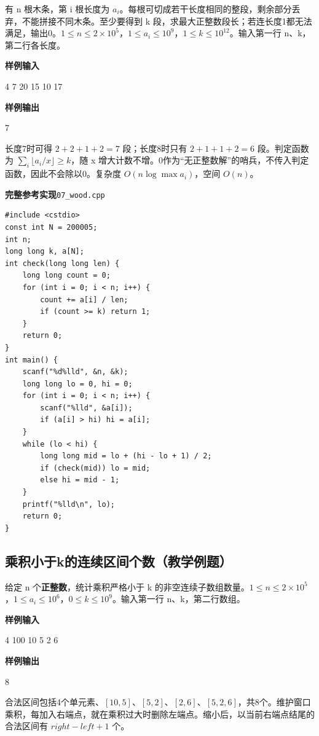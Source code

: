 \documentclass[UTF8,11pt,a4paper,fontset=none]{ctexart}
\begin{document}
有 n 根木条，第 i 根长度为 $a_i$。每根可切成若干长度相同的整段，剩余部分丢弃，不能拼接不同木条。至少要得到 k 段，求最大正整数段长；若连长度1都无法满足，输出0。$1\le n\le2\times10^5$，$1\le a_i\le10^9$，$1\le k\le10^{12}$。输入第一行 n、k，第二行各长度。
\begin{tcolorbox}[samplebox,title={输入输出样例}]
\textbf{样例输入}
\begin{Sample}
4 7
20 15 10 17
\end{Sample}
\tcblower
\textbf{样例输出}
\begin{Sample}
7
\end{Sample}
\end{tcolorbox}
长度7时可得 $2+2+1+2=7$ 段；长度8时只有 $2+1+1+2=6$ 段。判定函数为 $\sum_i\lfloor a_i/x\rfloor\ge k$，随 x 增大计数不增。0作为“无正整数解”的哨兵，不传入判定函数，因此不会除以0。复杂度 $O(n\log\max a_i)$，空间 $O(n)$。
\par\noindent\begin{minipage}{\linewidth}
\textbf{完整参考实现}\quad\texttt{07\_wood.cpp}
\begin{lstlisting}
#include <cstdio>
const int N = 200005;
int n;
long long k, a[N];
int check(long long len) {
    long long count = 0;
    for (int i = 0; i < n; i++) {
        count += a[i] / len;
        if (count >= k) return 1;
    }
    return 0;
}
int main() {
    scanf("%d%lld", &n, &k);
    long long lo = 0, hi = 0;
    for (int i = 0; i < n; i++) {
        scanf("%lld", &a[i]);
        if (a[i] > hi) hi = a[i];
    }
    while (lo < hi) {
        long long mid = lo + (hi - lo + 1) / 2;
        if (check(mid)) lo = mid;
        else hi = mid - 1;
    }
    printf("%lld\n", lo);
    return 0;
}
\end{lstlisting}
\end{minipage}\par

\subsection{乘积小于k的连续区间个数（教学例题）}

给定 n 个\textbf{正整数}，统计乘积严格小于 k 的非空连续子数组数量。$1\le n\le2\times10^5$，$1\le a_i\le10^6$，$0\le k\le10^9$。输入第一行 n、k，第二行数组。
\begin{tcolorbox}[samplebox,title={输入输出样例}]
\textbf{样例输入}
\begin{Sample}
4 100
10 5 2 6
\end{Sample}
\tcblower
\textbf{样例输出}
\begin{Sample}
8
\end{Sample}
\end{tcolorbox}
合法区间包括4个单元素、$[10,5]$、$[5,2]$、$[2,6]$、$[5,2,6]$，共8个。维护窗口乘积，每加入右端点，就在乘积过大时删除左端点。缩小后，以当前右端点结尾的合法区间有 $right-left+1$ 个。
\end{document}
